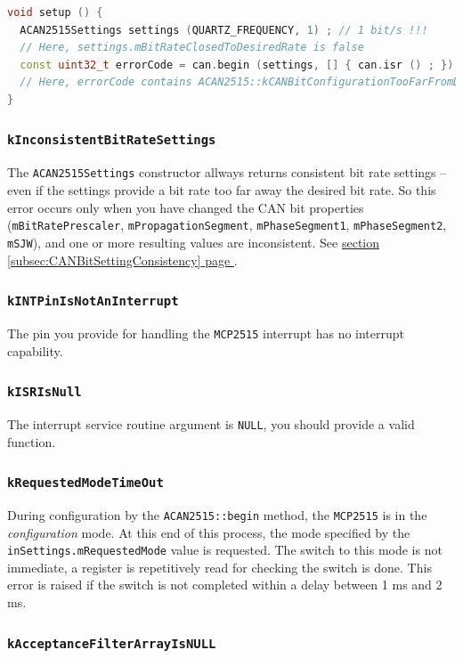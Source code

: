 \documentclass[10pt, a4paper, obeyspaces, openany]{extarticle}
\newcommand\refSubsectionPage[1]{\hyperref[subsec:#1]{section \ref*{subsec:#1} page \pageref{subsec:#1}}}
\newcommand \subsubsectionLabel[2]{\subsubsection{#1}\label{subsubsec:#2}}
\begin{document}
{ \small\begin{lstlisting}[language=c++]
void setup () {
  ACAN2515Settings settings (QUARTZ_FREQUENCY, 1) ; // 1 bit/s !!!
  // Here, settings.mBitRateClosedToDesiredRate is false
  const uint32_t errorCode = can.begin (settings, [] { can.isr () ; }) ;
  // Here, errorCode contains ACAN2515::kCANBitConfigurationTooFarFromDesiredBitRate
}
\end{lstlisting}}




\subsubsectionLabel{\texttt{kInconsistentBitRateSettings}}{kInconsistentBitRateSettings}

The \texttt{ACAN2515Settings} constructor allways returns consistent bit rate settings -- even if the settings provide a bit rate too far away the desired bit rate. So this error occurs only when you have changed the CAN bit properties (\texttt{mBitRatePrescaler}, \texttt{mPropagationSegment}, \texttt{mPhaseSegment1}, \texttt{mPhaseSegment2}, \texttt{mSJW}), and one or more resulting values are inconsistent. See \refSubsectionPage{CANBitSettingConsistency}.











\subsubsectionLabel{\texttt{kINTPinIsNotAnInterrupt}}{kINTPinIsNotAnInterrupt}

The pin you provide for handling the \texttt{MCP2515} interrupt has no interrupt capability.

\subsubsectionLabel{\texttt{kISRIsNull}}{kISRIsNull}

The interrupt service routine argument is \texttt{NULL}, you should provide a valid function.


\subsubsectionLabel{\texttt{kRequestedModeTimeOut}}{kRequestedModeTimeOut}

During configuration by the \texttt{ACAN2515::begin} method, the  \texttt{MCP2515} is in the \emph{configuration} mode. At this end of this process, the mode specified by the \texttt{inSettings.mRequestedMode} value is requested. The switch to this mode is not immediate, a register is repetitively read for checking the switch is done. This error is raised if the switch is not completed within a delay between 1 ms and 2 ms.






\subsubsectionLabel{\texttt{kAcceptanceFilterArrayIsNULL}}{kAcceptanceFilterArrayIsNULL}
\end{document}
